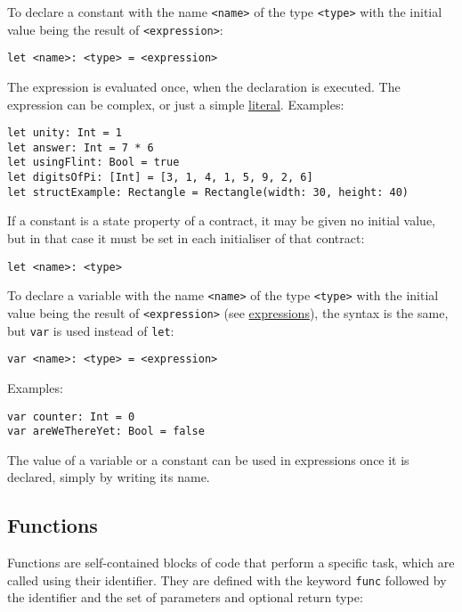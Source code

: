 To declare a constant with the name \texttt{<name>} of the type \texttt{<type>} with the initial value being the result of \texttt{<expression>}:

\begin{verbatim}
let <name>: <type> = <expression>
\end{verbatim}

The expression is evaluated once, when the declaration is executed. The expression can be complex, or just a simple \hyperref[sec:appendix-b-literals]{literal}. Examples:

\begin{verbatim}
let unity: Int = 1
let answer: Int = 7 * 6
let usingFlint: Bool = true
let digitsOfPi: [Int] = [3, 1, 4, 1, 5, 9, 2, 6]
let structExample: Rectangle = Rectangle(width: 30, height: 40)
\end{verbatim}

If a constant is a state property of a contract, it may be given no initial value, but in that case it must be set in each initialiser of that contract:

\begin{verbatim}
let <name>: <type>
\end{verbatim}

To declare a variable with the name \texttt{<name>} of the type \texttt{<type>} with the initial value being the result of \texttt{<expression>} (see \hyperref[sec:appendix-b-expressions]{expressions}), the syntax is the same, but \texttt{var} is used instead of \texttt{let}:

\begin{verbatim}
var <name>: <type> = <expression>
\end{verbatim}

Examples:

\begin{verbatim}
var counter: Int = 0
var areWeThereYet: Bool = false
\end{verbatim}

The value of a variable or a constant can be used in expressions once it is declared, simply by writing its name.

\subsection{Functions}
\label{sec:appendix-b-functions}

Functions are self-contained blocks of code that perform a specific task, which are called using their identifier. They are defined with the keyword \texttt{func} followed by the identifier and the set of parameters and optional return type:

